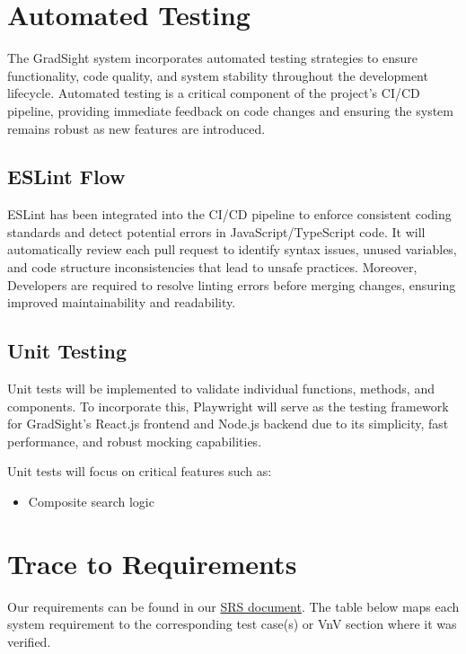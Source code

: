 \documentclass[12pt, titlepage]{article}
\begin{document}
\section{Automated Testing}

The GradSight system incorporates automated testing strategies to ensure functionality, code quality, and system stability throughout the development lifecycle. Automated testing is a critical component of the project’s CI/CD pipeline, providing immediate feedback on code changes and ensuring the system remains robust as new features are introduced.

\subsection{ESLint Flow}

ESLint has been integrated into the CI/CD pipeline to enforce consistent coding standards and detect potential errors in JavaScript/TypeScript code. It will automatically review each pull request to identify syntax issues, unused variables, and code structure inconsistencies that lead to unsafe practices. Moreover, Developers are required to resolve linting errors before merging changes, ensuring improved maintainability and readability.

\subsection{Unit Testing}

Unit tests will be implemented to validate individual functions, methods, and components. To incorporate this, Playwright will serve as the testing framework for GradSight’s React.js frontend and Node.js backend due to its simplicity, fast performance, and robust mocking capabilities.

Unit tests will focus on critical features such as:

\begin{itemize}
    \item Composite search logic
\end{itemize}
		
\section{Trace to Requirements}

Our requirements can be found in our \href{https://github.com/PaisWillie/Digital-Composite/blob/main/docs/SRS-Volere/SRS.pdf}{SRS document}. The table below maps each system requirement to the corresponding test case(s) or VnV section where it was verified.
\end{document}
